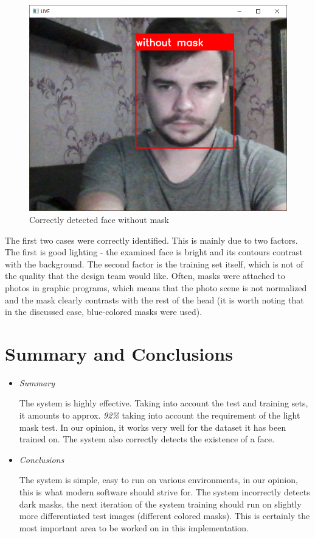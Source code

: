 \documentclass[12pt,a4paper]{article}
\begin{document}
\begin{figure}[h!]
    \centering
    \includegraphics[scale = 0.38]{media/false_bez.png}
    \caption{Correctly detected face without mask}
    \label{fig:Rysunek2}
\end{figure}
\newpage
The first two cases were correctly identified. This is mainly due to two factors. The first is good lighting - the examined face is bright and its contours contrast with the background. The second factor is the training set itself, which is not of the quality that the design team would like. Often, masks were attached to photos in graphic programs, which means that the photo scene is not normalized and the mask clearly contrasts with the rest of the head (it is worth noting that in the discussed case, blue-colored masks were used).

\newpage

\section{Summary and Conclusions}

\begin{itemize}
\item \textit{Summary}

The system is highly effective. Taking into account the test and training sets, it amounts to approx. \textit{92\%} taking into account the requirement of the light mask test. In our opinion, it works very well for the dataset it has been trained on. The system also correctly detects the existence of a face. 

\item \textit{Conclusions}

The system is simple, easy to run on various environments, in our opinion, this is what modern software should strive for. The system incorrectly detects dark masks, the next iteration of the system training should run on slightly more differentiated test images (different colored masks). This is certainly the most important area to be worked on in this implementation.  

\end{itemize}
\end{document}
